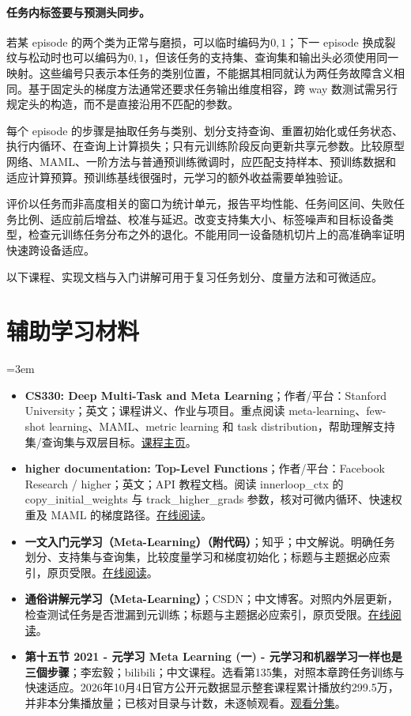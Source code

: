 \paragraph{任务内标签要与预测头同步。}
若某 episode 的两个类为正常与磨损，可以临时编码为$0,1$；下一 episode 换成裂纹与松动时也可以编码为$0,1$，但该任务的支持集、查询集和输出头必须使用同一映射。这些编号只表示本任务的类别位置，不能据其相同就认为两任务故障含义相同。基于固定头的梯度方法通常还要求任务输出维度相容，跨 way 数测试需另行规定头的构造，而不是直接沿用不匹配的参数。

每个 episode 的步骤是抽取任务与类别、划分支持查询、重置初始化或任务状态、执行内循环、在查询上计算损失；只有元训练阶段反向更新共享元参数。比较原型网络、MAML、一阶方法与普通预训练微调时，应匹配支持样本、预训练数据和适应计算预算。预训练基线很强时，元学习的额外收益需要单独验证\cite{chen2019closer}。

评价以任务而非高度相关的窗口为统计单元，报告平均性能、任务间区间、失败任务比例、适应前后增益、校准与延迟。改变支持集大小、标签噪声和目标设备类型，检查元训练任务分布之外的退化。不能用同一设备随机切片上的高准确率证明快速跨设备适应。

以下课程、实现文档与入门讲解可用于复习任务划分、度量方法和可微适应。
\section*{辅助学习材料}
\begingroup
\emergencystretch=3em
\begin{itemize}
\item \textbf{CS330: Deep Multi-Task and Meta Learning}；作者/平台：Stanford University；英文；课程讲义、作业与项目。重点阅读 meta-learning、few-shot learning、MAML、metric learning 和 task distribution，帮助理解支持集/查询集与双层目标。\href{https://web.stanford.edu/class/cs330/}{课程主页}。
\item \textbf{higher documentation: Top-Level Functions}；作者/平台：Facebook Research / higher；英文；API 教程文档。阅读 innerloop\_ctx 的 copy\_initial\_weights 与 track\_higher\_grads 参数，核对可微内循环、快速权重及 MAML 的梯度路径。\href{https://higher.readthedocs.io/en/latest/toplevel.html}{在线阅读}。
\item \textbf{一文入门元学习（Meta-Learning）（附代码）}；知乎；中文解说。明确任务划分、支持集与查询集，比较度量学习和梯度初始化；标题与主题据必应索引，原页受限。\href{https://zhuanlan.zhihu.com/p/136975128}{在线阅读}。
\item \textbf{通俗讲解元学习（Meta-Learning）}；CSDN；中文博客。对照内外层更新，检查测试任务是否泄漏到元训练；标题与主题据必应索引，原页受限。\href{https://blog.csdn.net/bruce\_\_ray/article/details/131144371}{在线阅读}。
\item \textbf{第十五节 2021 - 元学习 Meta Learning (一) - 元学习和机器学习一样也是三個步骤}；李宏毅；bilibili；中文课程。选看第135集，对照本章跨任务训练与快速适应。2026年10月4日官方公开元数据显示整套课程累计播放约299.5万，并非本分集播放量；已核对目录与计数，未逐帧观看。\href{https://www.bilibili.com/video/BV1Wv411h7kN/?p=135}{观看分集}。
\end{itemize}
\endgroup
